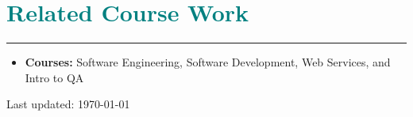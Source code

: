 \documentclass[11pt]{article}
\begin{document}
\section*{\textcolor{teal}{Related Course Work}}
\hrule
\vspace{2px}
\begin{itemize}
    \item \textbf{Courses:} \small{Software Engineering, Software Development, Web Services, and Intro to QA}
\end{itemize}

\begin{center}
  \begin{footnotesize}
    Last updated: \today \\
  \end{footnotesize}
\end{center}

\setlength{\footskip}{0pt}

\end{document}
